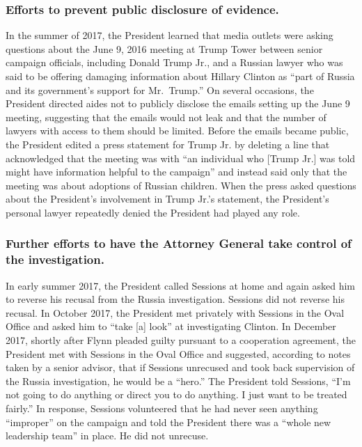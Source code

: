 \subsubsection*{Efforts to prevent public disclosure of evidence.}

In the summer of 2017, the President learned that media outlets were asking questions about the June 9, 2016 meeting at Trump Tower between senior campaign officials, including Donald Trump Jr., and a Russian lawyer who was said to be offering damaging information about Hillary Clinton as “part of Russia and its government’s support for Mr.~Trump.”
On several occasions, the President directed aides not to publicly disclose the emails setting up the June 9 meeting, suggesting that the emails would not leak and that the number of lawyers with access to them should be limited.
Before the emails became public, the President edited a press statement for Trump Jr. by deleting a line that acknowledged that the meeting was with “an individual who [Trump Jr.] was told might have information helpful to the campaign” and instead said only that the meeting was about adoptions of Russian children.
When the press asked questions about the President’s involvement in Trump Jr.’s statement, the President’s personal lawyer repeatedly denied the President had played any role.

\subsubsection*{Further efforts to have the Attorney General take control of the investigation.}

In early summer 2017, the President called Sessions at home and again asked him to reverse his recusal from the Russia investigation. Sessions did not reverse his recusal.
In October 2017, the President met privately with Sessions in the Oval Office and asked him to “take [a] look” at investigating Clinton.
In December 2017, shortly after Flynn pleaded guilty pursuant to a cooperation agreement, the President met with Sessions in the Oval Office and suggested, according to notes taken by a senior advisor, that if Sessions unrecused and took back supervision of the Russia investigation, he would be a “hero.”
The President told Sessions, “I’m not going to do anything or direct you to do anything.
I just want to be treated fairly.”
In response, Sessions volunteered that he had never seen anything “improper” on the campaign and told the President there was a “whole new leadership team” in place.
He did not unrecuse.

